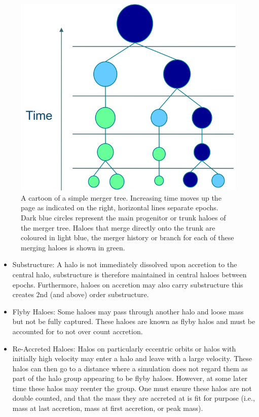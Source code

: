 \begin{figure}[h]
	\centering
	\includegraphics[width = \linewidth]{Figures/Chapter1/Merger_Tree_Simple.png}
    \caption{A cartoon of a simple merger tree. Increasing time moves up the page as indicated on the right, horizontal lines separate epochs. Dark blue circles represent the main progenitor or trunk haloes of the merger tree. Haloes that merge directly onto the trunk are coloured in light blue, the merger history or branch for each of these merging haloes is shown in green.}
	\label{fig:SimpleTree}
\end{figure}

\begin{itemize}
    \item Substructure: A halo is not immediately dissolved upon accretion to the central halo, substructure is therefore maintained in central haloes between epochs. Furthermore, haloes on accretion may also carry substructure this creates 2nd (and above) order substructure.
    \item Flyby Haloes: Some haloes may pass through another halo and loose mass but not be fully captured. These haloes are known as flyby halos and must be accounted for to not over count accretion.
    \item Re-Accreted Haloes: Halos on particularly eccentric orbits or halos with initially high velocity may enter a halo and leave with a large velocity. These halos can then go to a distance where a simulation does not regard them as part of the halo group appearing to be flyby haloes. However, at some later time these halos may reenter the group. One must ensure these halos are not double counted, and that the mass they are accreted at is fit for purpose (i.e., mass at last accretion, mass at first accretion, or peak mass).
\end{itemize}

